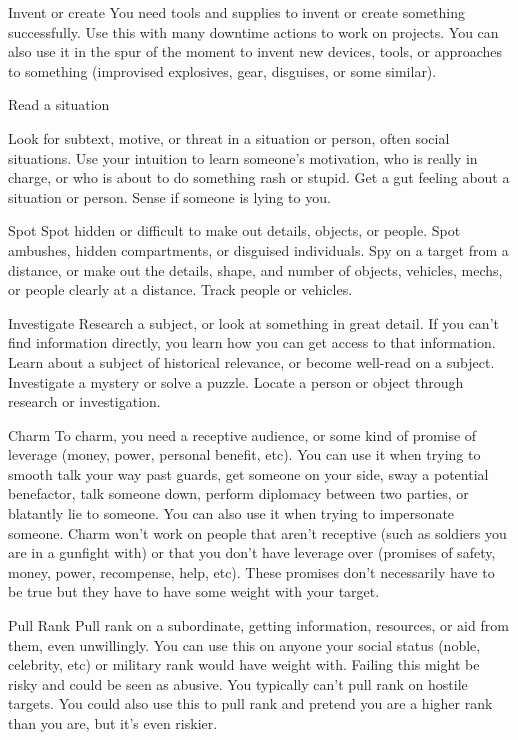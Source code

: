 Invent or create
You need tools and supplies to invent or create something successfully. Use this with many
downtime actions to work on projects. You can also use it in the spur of the moment to invent new
devices, tools, or approaches to something (improvised explosives, gear, disguises, or some
similar).

Read a situation




Look for subtext, motive, or threat in a situation or person, often social situations. Use your
intuition to learn someone’s motivation, who is really in charge, or who is about to do something
rash or stupid. Get a gut feeling about a situation or person. Sense if someone is lying to you.

Spot
Spot hidden or difficult to make out details, objects, or people. Spot ambushes, hidden
compartments, or disguised individuals. Spy on a target from a distance, or make out the details,
shape, and number of objects, vehicles, mechs, or people clearly at a distance. Track people or
vehicles.

Investigate
Research a subject, or look at something in great detail. If you can’t find information directly, you
learn how you can get access to that information. Learn about a subject of historical relevance, or
become well-read on a subject. Investigate a mystery or solve a puzzle. Locate a person or object
through research or investigation.

Charm
To charm, you need a receptive audience, or some kind of promise of leverage (money, power,
personal benefit, etc). You can use it when trying to smooth talk your way past guards, get
someone on your side, sway a potential benefactor, talk someone down, perform diplomacy
between two parties, or blatantly lie to someone. You can also use it when trying to impersonate
someone. Charm won’t work on people that aren’t receptive (such as soldiers you are in a
gunfight with) or that you don’t have leverage over (promises of safety, money, power,
recompense, help, etc). These promises don’t necessarily have to be true but they have to have
some weight with your target.

Pull Rank
Pull rank on a subordinate, getting information, resources, or aid from them, even unwillingly. You
can use this on anyone your social status (noble, celebrity, etc) or military rank would have weight
with. Failing this might be risky and could be seen as abusive. You typically can’t pull rank on
hostile targets. You could also use this to pull rank and pretend you are a higher rank than you
are, but it’s even riskier.

